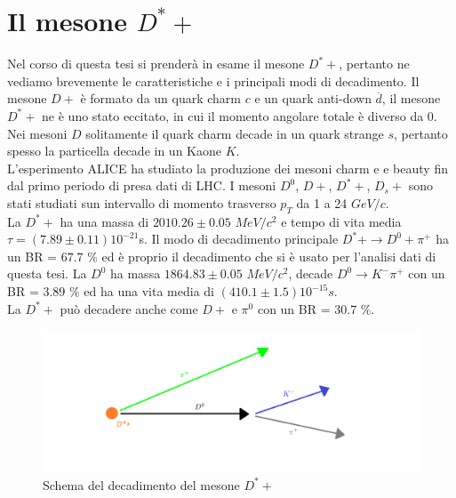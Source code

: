 \section{Il mesone $D^*+$}
Nel corso di questa tesi si prenderà in esame il mesone $D^*+$, pertanto ne vediamo brevemente le caratteristiche e i principali modi di decadimento. Il mesone $D+$ è formato da un quark charm $c$ e un quark anti-down $\overline{d}$, il mesone $D^*+$ ne è uno stato eccitato, in cui il momento angolare totale è diverso da 0. Nei mesoni $D$ solitamente il quark charm decade in un quark strange $s$, pertanto spesso la particella decade in un Kaone $K$. 
\\L'esperimento ALICE ha studiato la produzione dei mesoni charm e e beauty fin dal primo periodo di presa dati di LHC. I mesoni $D^0$, $D+$, $D^*+$, $D_s+$  sono stati studiati sun intervallo di momento trasverso $p_T$ da 1 a 24 $GeV/c$.  \cite{mesoniD}
\\La $D^*+$ ha una massa di $2010.26 \pm 0.05$ $MeV/c^2$ e tempo di vita media $ \tau = (7.89 \pm 0.11) {10^{-21}}$s. Il modo di decadimento principale $D^*+ \rightarrow D^0 + \pi^+ $ ha un BR = $67.7$ $\% $ ed è proprio il decadimento che si è usato per l'analisi dati di questa tesi. La $D^0$ ha massa $ 1864.83 \pm 0.05 $ $MeV/c^2$, decade $D^0 \rightarrow K^- \pi^+$ con un BR = $3.89$ $\%$ ed ha una vita media di $(410.1 \pm 1.5 ) 10^{-15} s $.
\\La $D^*+$ può decadere anche come $D+$ e $\pi^0$ con un BR = $30.7$ $\%$. \cite{PDG}

    \begin{figure}[htbp]
        \centering
        \includegraphics[width=1.0\linewidth]{introParticelle/decadimentoD.png}
        \caption{ Schema del decadimento del mesone $D^*+$}
        \label{fig:decadimentoD}
    \end{figure}









